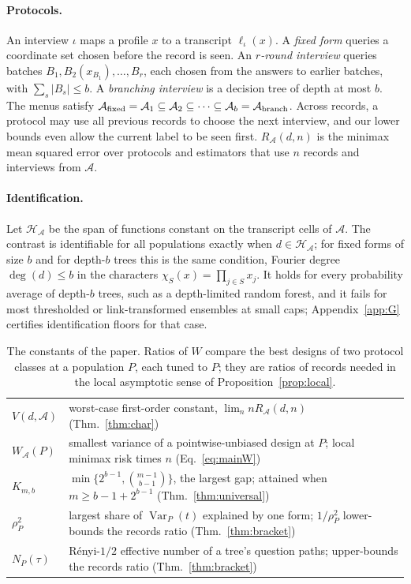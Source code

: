 \documentclass{article}
\newcommand{\Var}{\operatorname{Var}}
\newcommand{\A}{\mathcal A}
\newcommand{\Hh}{\mathcal H}
\begin{document}
\paragraph{Protocols.}
An interview $\iota$ maps a profile $x$ to a transcript $\ell_\iota(x)$. A \emph{fixed form} queries a coordinate set chosen before the record is seen. An \emph{$r$-round interview} queries batches $B_1,B_2(x_{B_1}),\ldots,B_r$, each chosen from the answers to earlier batches, with $\sum_s|B_s|\le b$. A \emph{branching interview} is a decision tree of depth at most $b$. The menus satisfy $\A_{\rm fixed}=\A_1\subseteq\A_2\subseteq\cdots\subseteq\A_b=\A_{\rm branch}$. Across records, a protocol may use all previous records to choose the next interview, and our lower bounds even allow the current label to be seen first. $R_\A(d,n)$ is the minimax mean squared error over protocols and estimators that use $n$ records and interviews from $\A$.

\paragraph{Identification.}
Let $\Hh_\A$ be the span of functions constant on the transcript cells of $\A$. The contrast is identifiable for all populations exactly when $d\in\Hh_\A$; for fixed forms of size $b$ and for depth-$b$ trees this is the same condition, Fourier degree $\deg(d)\le b$ in the characters $\chi_S(x)=\prod_{j\in S}x_j$. It holds for every probability average of depth-$b$ trees, such as a depth-limited random forest, and it fails for most thresholded or link-transformed ensembles at small caps; Appendix~\ref{app:G} certifies identification floors for that case.

\begin{table}[t]
\centering
\caption{The constants of the paper. Ratios of $W$ compare the best designs of two protocol classes at a population $P$, each tuned to $P$; they are ratios of records needed in the local asymptotic sense of Proposition~\ref{prop:local}.}
\label{tab:constants}
\footnotesize
\setlength{\tabcolsep}{2.5pt}
\begin{tabular}{lp{6.4cm}}
\toprule
$V(d,\A)$ & worst-case first-order constant, $\lim_n nR_\A(d,n)$ (Thm.~\ref{thm:char})\\
$W_\A(P)$ & smallest variance of a pointwise-unbiased design at $P$; local minimax risk times $n$ (Eq.~\ref{eq:mainW})\\
$K_{m,b}$ & $\min\{2^{b-1},\binom{m-1}{b-1}\}$, the largest gap; attained when $m\ge b-1+2^{b-1}$ (Thm.~\ref{thm:universal})\\
$\rho_P^2$ & largest share of $\Var_P(t)$ explained by one form; $1/\rho_P^2$ lower-bounds the records ratio (Thm.~\ref{thm:bracket})\\
$N_P(\tau)$ & R\'enyi-$1/2$ effective number of a tree's question paths; upper-bounds the records ratio (Thm.~\ref{thm:bracket})\\
\bottomrule
\end{tabular}
\end{table}
\end{document}
